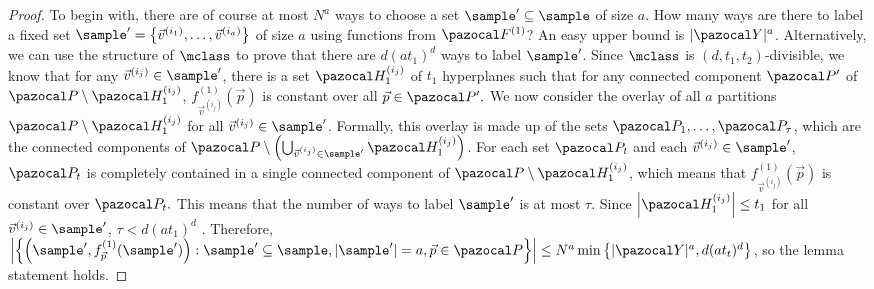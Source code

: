 \begin{proof}
To begin with, there are of course at most $N^a$ ways to choose a set $\sample' \subseteq \sample$ of size $a$. How many ways are there to label a fixed set $\sample' = \left\{\vec{v}^{(i_1)}, \dots, \vec{v}^{(i_a)}\right\}$ of size $a$ using functions from $\fclass^{(1)}$? An easy upper bound is $|\range|^a$. Alternatively, we can use the structure of $\mclass$ to prove that there are $d(at_1)^d$ ways to label $\sample'$. Since $\mclass$ is $(d,t_1, t_2)$-divisible, we know that for any $\vec{v}^{(i_j)} \in \sample'$, there is a set $\hyp_1^{(i_j)}$ of $t_1$ hyperplanes such that for any connected component $\pspace'$ of $\pspace \setminus \hyp_1^{(i_j)}$, $f^{(1)}_{\vec{v}^{(i_j)}}(\vec{p})$ is constant over all $\vec{p} \in \pspace'.$
We now consider the overlay of all $a$ partitions $\pspace\setminus \hyp_1^{(i_j)}$ for all $\vec{v}^{(i_j)} \in \sample'$. Formally, this overlay is made up of the sets $\pspace_1, \dots, \pspace_{\tau}$, which are the connected components 
of $\pspace \setminus \left(\bigcup_{\vec{v}^{(i_j)} \in \sample'} \hyp_1^{(i_j)}\right)$. For each set $\pspace_t$ and each $\vec{v}^{(i_j)} \in \sample'$, $\pspace_t$ is completely contained in a single connected component of $\pspace \setminus \hyp_1^{(i_j)}$, which means that $f^{(1)}_{\vec{v}^{(i_j)}}\left(\vec{p}\right)$ is constant over $\pspace_t.$ 
%
This means that the number of ways to label $\sample'$ is at most $\tau$. Since $\left|\hyp_1^{(i_j)}\right|\leq t_1$ for all $\vec{v}^{(i_j)} \in \sample'$, $\tau < d(at_1)^d$ \citep{Buck43:Partition}.
Therefore, $\left|\left\{ \left(\sample', f^{(1)}_{\vec{p}}(\sample')\right) : \sample' \subseteq \sample, |\sample'| = a, \vec{p} \in \pspace\right\}\right| \leq N^a\min\left\{|\range|^a, d(at_t)^d\right\}$, so the lemma statement holds.
\end{proof}